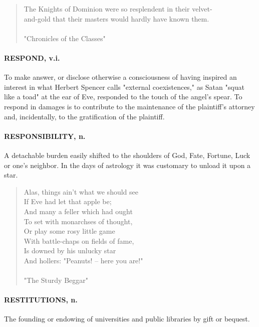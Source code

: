 \documentclass[11pt]{article}
\begin{document}
\begin{quote}       The Knights of Dominion were so resplendent in their velvet- \\
  and-gold that their masters would hardly have known them. \\
 \\
"Chronicles of the Classes" \end{quote}


\paragraph{RESPOND, v.i.}  To make answer, or disclose otherwise a consciousness
of having inspired an interest in what Herbert Spencer calls "external
coexistences," as Satan "squat like a toad" at the ear of Eve,
responded to the touch of the angel's spear.  To respond in damages is
to contribute to the maintenance of the plaintiff's attorney and,
incidentally, to the gratification of the plaintiff.

\paragraph{RESPONSIBILITY, n.}  A detachable burden easily shifted to the
shoulders of God, Fate, Fortune, Luck or one's neighbor.  In the days
of astrology it was customary to unload it upon a star.

\begin{quote}   Alas, things ain't what we should see \\
  If Eve had let that apple be; \\
  And many a feller which had ought \\
  To set with monarchses of thought, \\
  Or play some rosy little game \\
  With battle-chaps on fields of fame, \\
  Is downed by his unlucky star \\
  And hollers:  "Peanuts! -- here you are!" \\
 \\
"The Sturdy Beggar" \end{quote}


\paragraph{RESTITUTIONS, n.}  The founding or endowing of universities and public
libraries by gift or bequest.
\end{document}
